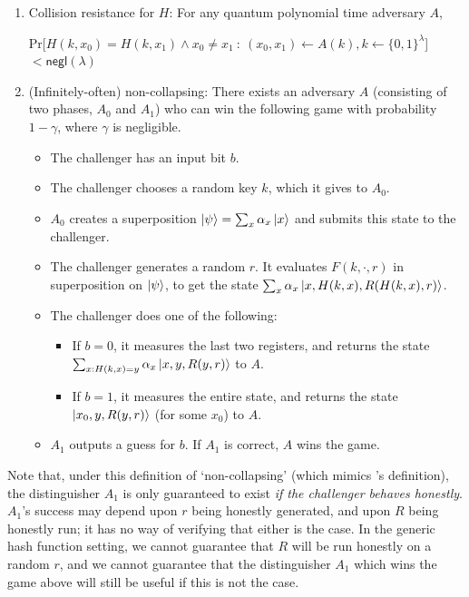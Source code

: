 \documentclass{article}
\begin{document}
\begin{enumerate}
    \item Collision resistance for $H$: For any quantum polynomial time adversary $A$,
    \begin{center}
        Pr[$H(k, x_0) = H(k, x_1) \wedge x_0 \neq x_1 \: : \: (x_0, x_1) \leftarrow A(k), k \leftarrow \{0, 1\}^\lambda$] $< \textsf{negl}(\lambda)$
    \end{center}
    \item (Infinitely-often) non-collapsing: There exists an adversary $A$ (consisting of two phases, $A_0$ and $A_1$) who can win the following game with probability $1-\gamma$, where $\gamma$ is negligible.
    \begin{itemize}
        \item The challenger has an input bit $b$.
        \item The challenger chooses a random key $k$, which it gives to $A_0$.
        \item $A_0$ creates a superposition $\ket{\psi} = \sum_x \alpha_x \ket{x}$ and submits this state to the challenger.
        \item The challenger generates a random $r$. It evaluates $F(k, \cdot, r)$ in superposition on $\ket{\psi}$, to get the state $\sum_x \alpha_x \ket{x, H(k, x), R(H(k, x), r)}$.
        \item The challenger does one of the following:
        \begin{itemize}
            \item If $b = 0$, it measures the last two registers, and returns the state $\sum_{x : H(k, x) = y} \alpha_x \ket{x, y, R(y, r)}$ to $A$.
            \item If $b = 1$, it measures the entire state, and returns the state $\ket{x_0, y, R(y, r)}$ (for some $x_0$) to $A$.
        \end{itemize}
        \item $A_1$ outputs a guess for $b$. If $A_1$ is correct, $A$ wins the game.
    \end{itemize}
\end{enumerate}

Note that, under this definition of `non-collapsing' (which mimics \cite{zha17}'s definition), the distinguisher $A_1$ is only guaranteed to exist \textit{if the challenger behaves honestly}. $A_1$'s success may depend upon $r$ being honestly generated, and upon $R$ being honestly run; it has no way of verifying that either is the case. In the generic hash function setting, we cannot guarantee that $R$ will be run honestly on a random $r$, and we cannot guarantee that the distinguisher $A_1$ which wins the game above will still be useful if this is not the case.
\end{document}
